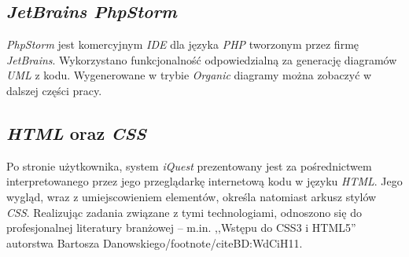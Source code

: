\subsection{\textit{JetBrains PhpStorm}}
\label{Chapter63a}

\textit{PhpStorm} jest komercyjnym \textit{IDE} dla języka \textit{PHP} tworzonym przez firmę \textit{JetBrains}. Wykorzystano funkcjonalność odpowiedzialną za generację diagramów \textit{UML} z kodu. Wygenerowane w trybie \textit{Organic} diagramy można zobaczyć w dalszej części pracy.

\subsection{\textit{HTML} oraz \textit{CSS}}
\label{Chapter63b}
Po stronie użytkownika, system \textit{iQuest} prezentowany jest za pośrednictwem interpretowanego przez jego przeglądarkę internetową kodu w języku \textit{HTML}. Jego wygląd, wraz z umiejscowieniem elementów, określa natomiast arkusz stylów \textit{CSS}. Realizując zadania związane z tymi technologiami, odnoszono się do profesjonalnej literatury branżowej -- m.in. ,,Wstępu do CSS3 i HTML5'' autorstwa Bartosza Danowskiego/footnote{/cite{BD:WdCiH11}}.